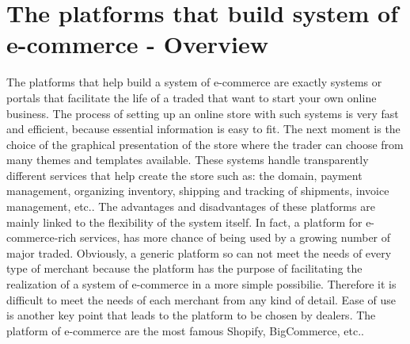 \section{The platforms that build system of e-commerce - Overview}
\label{sec:platform_overview}
The platforms that help build a system of e-commerce are exactly systems or portals that facilitate the life of a traded that want to start your own online business.
The process of setting up an online store with such systems is very fast and efficient, because essential information is easy to fit. The next moment is the choice of the graphical presentation of the store where the trader can choose from many themes and templates available.
These systems handle transparently different services that help create the store such as: the domain, payment management, organizing inventory, shipping and tracking of shipments, invoice management, etc..
The advantages and disadvantages of these platforms are mainly linked to the flexibility of the system itself. In fact, a platform for e-commerce-rich services, has more chance of being used by a growing number of major traded.
Obviously, a generic platform so can not meet the needs of every type of merchant because the platform has the purpose of facilitating the realization of a system of e-commerce in a more simple possibilie. Therefore it is difficult to meet the needs of each merchant from any kind of detail. Ease of use is another key point that leads to the platform to be chosen by dealers.
The platform of e-commerce are the most famous Shopify, BigCommerce, etc..